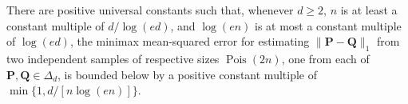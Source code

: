 There are positive universal constants such that, whenever \(d\geq2\), \(n\) is at least a constant multiple of \(d/\log(ed)\), and \(\log(en)\) is at most a constant multiple of \(\log(ed)\), the minimax mean-squared error for estimating \(\lVert\mathbf P-\mathbf Q\rVert_1\) from two independent samples of respective sizes \(\operatorname{Pois}(2n)\), one from each of \(\mathbf P,\mathbf Q\in\Delta_d\), is bounded below by a positive constant multiple of \(\min\{1,d/[n\log(en)]\}\).